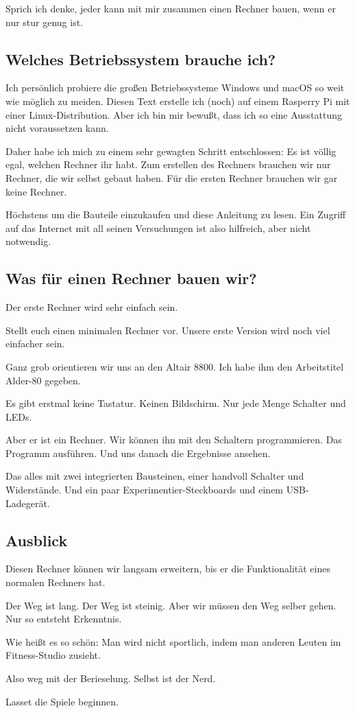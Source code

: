 \documentclass[a5paper,ngerman]{article}
\begin{document}
Sprich ich denke, jeder kann mit mir zusammen einen Rechner bauen,
wenn er nur stur genug ist.

\subsection{Welches Betriebssystem brauche ich?}

Ich persönlich probiere die großen Betriebssysteme Windows und macOS so
weit wie möglich zu meiden.
Diesen Text erstelle ich (noch) auf einem Rasperry Pi mit einer
Linux-Distribution.
Aber ich bin mir bewußt, dass ich so eine Ausstattung nicht voraussetzen
kann.

Daher habe ich mich zu einem sehr gewagten Schritt entschlossen:
Es ist völlig egal, welchen Rechner ihr habt.
Zum erstellen des Rechners brauchen wir nur Rechner, die wir selbst
gebaut haben.
Für die ersten Rechner brauchen wir gar keine Rechner.

Höchstens um die Bauteile einzukaufen und diese Anleitung zu lesen.
Ein Zugriff auf das Internet mit all seinen Versuchungen ist also
hilfreich, aber nicht notwendig.

\subsection{Was für einen Rechner bauen wir?}

Der erste Rechner wird sehr einfach sein.

Stellt euch einen minimalen Rechner vor.
Unsere erste Version wird noch viel einfacher sein.

Ganz grob orientieren wir uns an den Altair 8800.
Ich habe ihm den Arbeitstitel Alder-80 gegeben.

Es gibt erstmal keine Tastatur.
Keinen Bildschirm.
Nur jede Menge Schalter und LEDs.

Aber er ist ein Rechner.
Wir können ihn mit den Schaltern programmieren.
Das Programm ausführen.
Und uns danach die Ergebnisse ansehen.

Das alles mit zwei integrierten Bausteinen,
einer handvoll Schalter und Widerstände.
Und ein paar Experimentier-Steckboards und einem USB-Ladegerät.

\subsection{Ausblick}

Diesen Rechner können wir langsam erweitern,
bis er die Funktionalität eines normalen Rechners hat.

Der Weg ist lang.
Der Weg ist steinig.
Aber wir müssen den Weg selber gehen.
Nur so entsteht Erkenntnis.

Wie heißt es so schön:
Man wird nicht sportlich, indem man anderen Leuten im Fitness-Studio
zusieht.

Also weg mit der Berieselung.
Selbst ist der Nerd.

Lasset die Spiele beginnen.
\end{document}
